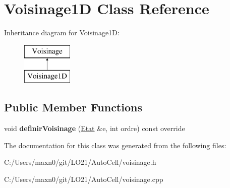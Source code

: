 \hypertarget{class_voisinage1_d}{}\section{Voisinage1D Class Reference}
\label{class_voisinage1_d}
Inheritance diagram for Voisinage1D\+:\begin{figure}[H]
\begin{center}
\leavevmode
\includegraphics[height=2.000000cm]{class_voisinage1_d}
\end{center}
\end{figure}
\subsection*{Public Member Functions}
\begin{DoxyCompactItemize}
\item 
\mbox{\label{class_voisinage1_d_a215808952e8ace3b25c89344e264cc56}} 
void {\bfseries definir\+Voisinage} (\mbox{\hyperlink{class_etat}{Etat}} \&e, int ordre) const override
\end{DoxyCompactItemize}


The documentation for this class was generated from the following files\+:\begin{DoxyCompactItemize}
\item 
C\+:/\+Users/maxn0/git/\+L\+O21/\+Auto\+Cell/voisinage.\+h\item 
C\+:/\+Users/maxn0/git/\+L\+O21/\+Auto\+Cell/voisinage.\+cpp\end{DoxyCompactItemize}

